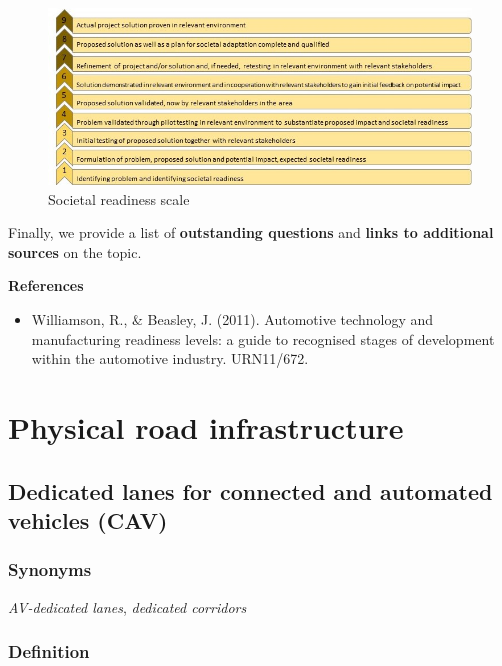 \documentclass[
]{book}
\providecommand{\tightlist}{%
  \setlength{\itemsep}{0pt}\setlength{\parskip}{0pt}}
\begin{document}
\begin{figure}
\includegraphics[width=2\linewidth]{image/SRL} \caption{Societal readiness scale}\label{fig:unnamed-chunk-3}
\end{figure}

Finally, we provide a list of \textbf{outstanding questions} and \textbf{links to additional sources} on the topic.

\textbf{References}

\begin{itemize}
\tightlist
\item
  Williamson, R., \& Beasley, J. (2011). Automotive technology and manufacturing readiness levels: a guide to recognised stages of development within the automotive industry. URN11/672.
\end{itemize}

\hypertarget{infrastructure}{%
\chapter{Physical road infrastructure}\label{infrastructure}}

\hypertarget{dedicated-lanes-for-connected-and-automated-vehicles-cav}{%
\section{Dedicated lanes for connected and automated vehicles (CAV)}\label{dedicated-lanes-for-connected-and-automated-vehicles-cav}}

\hypertarget{synonyms}{%
\subsection*{Synonyms}\label{synonyms}}

\emph{AV-dedicated lanes}, \emph{dedicated corridors}

\hypertarget{definition}{%
\subsection*{Definition}\label{definition}}
\end{document}
